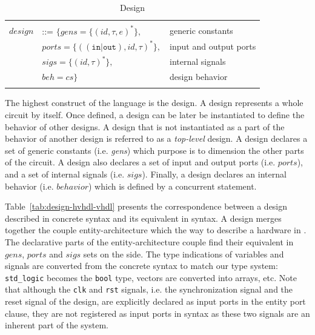 \documentclass[pdflatex,sn-mathphys]{sn-jnl}%
\theoremstyle{thmstyleone}%
\theoremstyle{thmstyletwo}%
\theoremstyle{thmstylethree}%
\begin{document}
\begin{table}[!htbp]
  \caption{Design}
  \label{tab:design}
  \begin{tabular}{|rll|}
    \hline
    & & \\
    $design$ & ::= $\{{}gens=\{(id,\tau,e)^{*}\},$ & generic constants \\
    & \quad\quad${}ports=\{((\mathtt{in}\vert\mathtt{out}),id,\tau)^{*}\},$ & input and output ports \\
    & \quad\quad${}sigs=\{(id,\tau)^{*}\},$ & internal signals \\
    & \quad\quad${}beh=cs\}$ & design behavior \\
    & & \\
    \hline
  \end{tabular}
\end{table}

The highest construct of the \hvhdl{} language is the design. A design
represents a whole circuit by itself. Once defined, a design can be
later be instantiated to define the behavior of other designs. A
design that is not instantiated as a part of the behavior of another
design is referred to as a \textit{top-level} design. A design
declares a set of generic constants (i.e. \textit{gens}) which purpose
is to dimension the other parts of the circuit. A design also declares
a set of input and output ports (i.e. $ports$), and a set of internal
signals (i.e. $sigs$). Finally, a design declares an internal behavior
(i.e. $behavior$) which is defined by a concurrent statement.

Table~\ref{tab:design-hvhdl-vhdl} presents the correspondence between
a design described in concrete \vhdl{} syntax and its equivalent in
\hvhdl{} syntax. A \hvhdl{} design merges together the couple
entity-architecture which the way to describe a hardware in
\vhdl{}. The declarative parts of the entity-architecture couple find
their equivalent in $gens$, $ports$ and $sigs$ sets on the \hvhdl{}
side. The type indications of variables and signals are converted from
the concrete syntax to match our type system: \texttt{std\_logic}
becomes the \texttt{bool} type, vectors are converted into arrays,
etc. Note that although the \texttt{clk} and \texttt{rst} signals,
i.e. the synchronization signal and the reset signal of the design,
are explicitly declared as input ports in the entity port clause, they
are not registered as input ports in \hvhdl{} syntax as these two
signals are an inherent part of the system.
\end{document}
